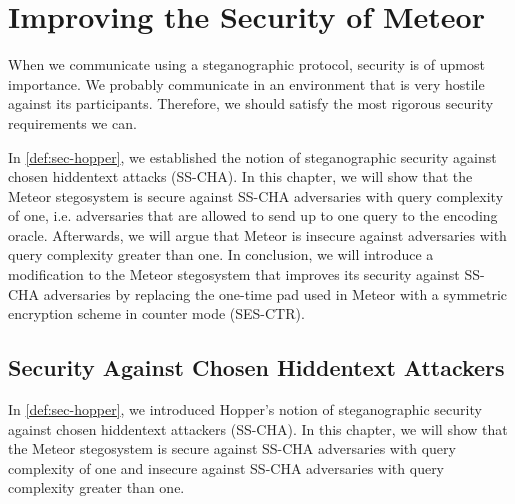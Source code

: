 \chapter{Improving the Security of Meteor}
\label{chap:security}

When we communicate using a steganographic protocol, security is of upmost importance.
We probably communicate in an environment that is very hostile against its participants.
Therefore, we should satisfy the most rigorous security requirements we can.

In \autoref{def:sec-hopper}, we established the notion of steganographic security against chosen hiddentext attacks (SS-CHA).
In this chapter, we will show that the Meteor stegosystem is secure against SS-CHA adversaries with query complexity of one, i.e. adversaries that are allowed to send up to one query to the encoding oracle.
Afterwards, we will argue that Meteor is insecure against adversaries with query complexity greater than one.
In conclusion, we will introduce a modification to the Meteor stegosystem that improves its security against SS-CHA adversaries by replacing the one-time pad used in Meteor with a symmetric encryption scheme in counter mode (SES-CTR).

\section{Security Against Chosen Hiddentext Attackers}

In \autoref{def:sec-hopper}, we introduced Hopper's notion of steganographic security against chosen hiddentext attackers (SS-CHA).
In this chapter, we will show that the Meteor stegosystem is secure against SS-CHA adversaries with query complexity of one and insecure against SS-CHA adversaries with query complexity greater than one.


